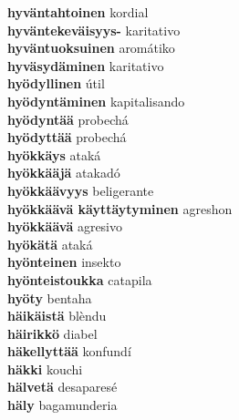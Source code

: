\textbf{ hyväntahtoinen  } kordial \\
\textbf{ hyväntekeväisyys-  } karitativo \\
\textbf{ hyväntuoksuinen  } aromátiko \\
\textbf{ hyväsydäminen  } karitativo \\
\textbf{ hyödyllinen  } útil \\
\textbf{ hyödyntäminen  } kapitalisando \\
\textbf{ hyödyntää  } probechá \\
\textbf{ hyödyttää  } probechá \\
\textbf{ hyökkäys  } ataká \\
\textbf{ hyökkääjä  } atakadó \\
\textbf{ hyökkäävyys  } beligerante \\
\textbf{ hyökkäävä käyttäytyminen  } agreshon \\
\textbf{ hyökkäävä  } agresivo \\
\textbf{ hyökätä  } ataká \\
\textbf{ hyönteinen  } insekto \\
\textbf{ hyönteistoukka  } catapila \\
\textbf{ hyöty  } bentaha \\
\textbf{ häikäistä  } blèndu \\
\textbf{ häirikkö  } diabel \\
\textbf{ häkellyttää  } konfundí \\
\textbf{ häkki  } kouchi \\
\textbf{ hälvetä  } desaparesé \\
\textbf{ häly  } bagamunderia \\
